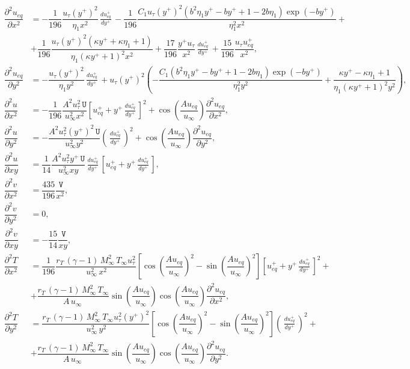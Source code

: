 \documentclass[10pt]{article}
\newcommand{\diff}[2] {\dfrac{\partial #1}{\partial #2}}
\newcommand{\U}{\,\mathtt{U}}
\newcommand{\V}{\,\mathtt{V}}
\newcommand{\Dueqplusyplus}{\, \frac{du_{eq}^+}{dy^+}\,}
\begin{document}
\begin{equation}\label{eq:aux_2d_02}
\begin{split}
%
\diff{^2u_{eq}}{x^2} &= -\dfrac{1}{196} \dfrac{ u_{\tau} (y^{+})^2 }{\eta_1 x^2}\Dueqplusyplus - \dfrac{1}{196} \dfrac{C_1 u_{\tau}(y^{+})^2 (b^2 \eta_1 y^{+}-b y^{+}+1-2 b \eta_1)  \exp(-b y^{+})}{\eta_1^2 x^2}+\\
  &+\dfrac{1}{196} \dfrac{ u_{\tau}(y^{+})^2 (\kappa y^{+}+\kappa \eta_1+1)}{\eta_1 (\kappa y^{+}+1)^2 x^2}+\dfrac{17}{196}\dfrac{ y^{+} u_{\tau} }{x^2}\Dueqplusyplus+\dfrac{15}{196} \dfrac{u_{\tau} u_{eq}^{+}}{x^2}, \\  
%
\diff{^2u_{eq}}{y^2} &= -\dfrac{ u_{\tau} (y^{+})^2 }{\eta_1 y^2 } \Dueqplusyplus+ u_{\tau} (y^{+})^2  \left(-\dfrac{ C_1(b^2 \eta_1 y^{+}-b y^{+}+1-2 b \eta_1) \exp(-b y^{+}) }{\eta_1^2 y^2 }+\dfrac{\kappa y^{+} -\kappa \eta_1+1}{\eta_1 (\kappa y^{+}+1)^2 y^2}\right), \\  
%
\diff{^2u}{x^2}&= -\dfrac{1}{196} \dfrac{A^2 u_{\tau}^2 \U }{u_{\infty}^2 x^2}\left[u_{eq}^{+}+y^{+} \Dueqplusyplus\right]^2+\cos\left(\dfrac{A u_{eq}}{u_{\infty}}\right) \diff{^2u_{eq}}{x^2}, \\ 
%
\diff{^2u}{y^2} &= -\dfrac{ A^2  u_{\tau}^2 (y^{+})^2 \U}{u_{\infty}^2 y^2}\left(\Dueqplusyplus\right)^2 + \cos\left(\dfrac{A u_{eq}}{u_{\infty}}\right)\diff{^2u_{eq}}{y^2} , \\  
%
\diff{^2u}{xy} &= \dfrac{1}{14}\dfrac{ A^2 u_{\tau}^2 y^{+}  \U}{u_{\infty}^2 x y}\Dueqplusyplus \left[u_{eq}^{+}+y^{+} \Dueqplusyplus\right], \\  
%
\diff{^2v}{x^2} &= \dfrac{435}{196} \dfrac{\V}{x^2} ,\\
%
\diff{^2v}{y^2} &= 0, \\  
%
\diff{^2v}{xy} &= -\dfrac{15}{14} \dfrac{\V}{xy},\\  
%
\diff{^2T}{x^2} &= \dfrac{1}{196}\dfrac{ r_T \, (\gamma-1) \, M_{\infty}^2 \, T_{\infty}  u_{\tau}^2}{ \, u_{\infty}^2 \, x^2} \left[\cos\left(\dfrac{A u_{eq}}{u_{\infty}}\right)^2 -\sin\left(\dfrac{A u_{eq}}{u_{\infty}}\right)^2 \right] \left[u_{eq}^{+}+y^{+} \Dueqplusyplus\right]^2 +\\
& +\dfrac{r_T \, (\gamma-1) \, M_{\infty}^2 \, T_{\infty}    }{A \, u_{\infty} \,} \sin\left(\dfrac{A u_{eq}}{u_{\infty}}\right) \cos\left(\dfrac{A u_{eq}}{u_{\infty}}\right)\diff{^2u_{eq}}{x^2}, \\  
%
\diff{^2T}{y^2}  &= \dfrac{r_T \, (\gamma-1) \, M_{\infty}^2 \, T_{\infty} u_{\tau}^2 (y^{+})^2 }{\, u_{\infty}^2 \, y^2} \left[\cos\left(\dfrac{A u_{eq}}{u_{\infty}}\right)^2  - \sin\left(\dfrac{A u_{eq}}{u_{\infty}}\right)^2 \right]\left(\Dueqplusyplus\right)^2+ \\ 
&+\dfrac{r_T \, (\gamma-1) \, M_{\infty}^2 \, T_{\infty} }{A \, u_{\infty} \,}	\sin\left(\dfrac{A u_{eq}}{u_{\infty}}\right) \cos\left(\dfrac{A u_{eq}}{u_{\infty}}\right) \diff{^2u_{eq}}{y^2}.
\end{split}
\end{equation}
\end{document}
